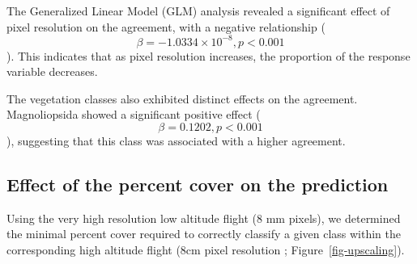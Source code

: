 \documentclass[
  number]{elsarticle}
\begin{document}
The Generalized Linear Model (GLM) analysis revealed a significant
effect of pixel resolution on the agreement, with a negative
relationship (\[\beta = -1.0334 \times 10^{-8}, p < 0.001\]). This
indicates that as pixel resolution increases, the proportion of the
response variable decreases.

The vegetation classes also exhibited distinct effects on the agreement.
Magnoliopsida showed a significant positive effect
(\[\beta = 0.1202, p < 0.001\]), suggesting that this class was
associated with a higher agreement.

\subsection{Effect of the percent cover on the
prediction}\label{effect-of-the-percent-cover-on-the-prediction}

Using the very high resolution low altitude flight (8 mm pixels), we
determined the minimal percent cover required to correctly classify a
given class within the corresponding high altitude flight (8cm pixel
resolution ; Figure~\ref{fig-upscaling}).
\end{document}
